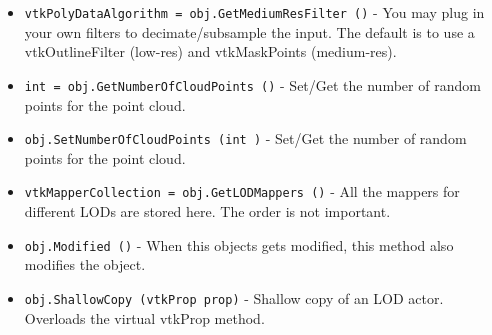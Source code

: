 \begin{itemize}
\item  \verb|vtkPolyDataAlgorithm = obj.GetMediumResFilter ()| -  You may plug in your own filters to decimate/subsample the input. The
 default is to use a vtkOutlineFilter (low-res) and vtkMaskPoints 
 (medium-res).

\item  \verb|int = obj.GetNumberOfCloudPoints ()| -  Set/Get the number of random points for the point cloud.

\item  \verb|obj.SetNumberOfCloudPoints (int )| -  Set/Get the number of random points for the point cloud.

\item  \verb|vtkMapperCollection = obj.GetLODMappers ()| -  All the mappers for different LODs are stored here.
 The order is not important.

\item  \verb|obj.Modified ()| -  When this objects gets modified, this method also modifies the object.

\item  \verb|obj.ShallowCopy (vtkProp prop)| -  Shallow copy of an LOD actor. Overloads the virtual vtkProp method.

\end{itemize}
